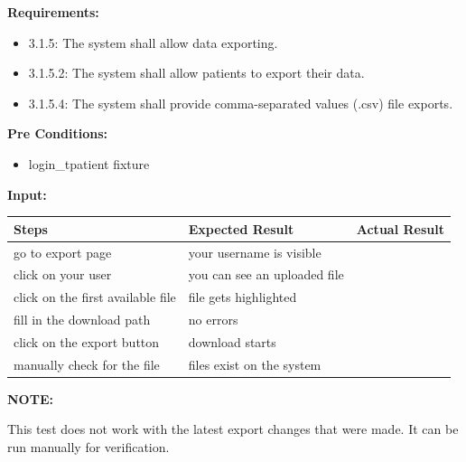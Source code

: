\documentclass[letterpaper,10pt,english]{sphinxmanual}
\begin{document}
\begin{fulllineitems}
\label{STD/test_export:test_export.test_export_data_by_patient}
\textbf{Requirements:}
\begin{itemize}
\item {} 
3.1.5: The system shall allow data exporting.

\item {} 
3.1.5.2: The system shall allow patients to export their data.

\item {} 
3.1.5.4: The system shall provide comma-separated values (.csv) file exports.

\end{itemize}

\textbf{Pre Conditions:}
\begin{itemize}
\item {} 
login\_tpatient fixture

\end{itemize}

\textbf{Input:}

\begin{tabulary}{\linewidth}{|L|L|L|}
\hline
\textsf{\relax 
Steps
} & \textsf{\relax 
Expected Result
} & \textsf{\relax 
Actual Result
}\\
\hline
go to export page
 & 
your username is visible
 & \\
\hline
click on your user
 & 
you can see an uploaded file
 & \\
\hline
click on the first available file
 & 
file gets highlighted
 & \\
\hline
fill in the download path
 & 
no errors
 & \\
\hline
click on the export button
 & 
download starts
 & \\
\hline
manually check for the file
 & 
files exist on the system
 & \\
\hline\end{tabulary}


\textbf{NOTE:}

This test does not work with the latest export changes that were made. It can be run manually for verification.

\end{fulllineitems}

\end{document}
